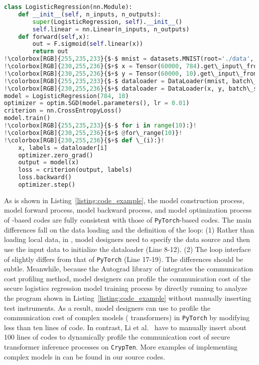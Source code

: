 \begin{lstlisting}[escapechar=!,mathescape,xleftmargin=2em,framexleftmargin=2em, language=python, columns=fullflexible, caption= {An example of modifying a \texttt{PyTorch}-based logistics regression model training codes to be \hawkeye-based. The removed \texttt{PyTorch} codes are highlighted on a red background and labeled with a minus sign at the beginning of the line. The newly added \hawkeye codes are highlighted on a green background and labeled with a plus sign at the beginning of the line.}, label={listing:code_example}]
class LogisticRegression(nn.Module):
    def __init__(self, n_inputs, n_outputs):
        super(LogisticRegression, self).__init__()
        self.linear = nn.Linear(n_inputs, n_outputs)
    def forward(self,x):
        out = F.sigmoid(self.linear(x))
        return out
!\colorbox[RGB]{255,235,233}{$-$ mnist = datasets.MNIST(root='./data', train=True)}!
!\colorbox[RGB]{230,255,236}{$+$ x = Tensor(60000, 784).get\_input\_from(0)}!
!\colorbox[RGB]{230,255,236}{$+$ y = Tensor(60000, 10).get\_input\_from(0)}!
!\colorbox[RGB]{255,235,233}{$-$ dataloader = DataLoader(mnist, batch\_size=128)}!
!\colorbox[RGB]{230,255,236}{$+$ dataloader = DataLoader(x, y, batch\_size = 128)}!
model = LogisticRegression(784, 10)
optimizer = optim.SGD(model.parameters(), lr = 0.01)
criterion = nn.CrossEntropyLoss()
model.train()
!\colorbox[RGB]{255,235,233}{$-$ for i in range(10):}!
!\colorbox[RGB]{230,255,236}{$+$ @for\_range(10)}!
!\colorbox[RGB]{230,255,236}{$+$ def \_(i):}!
    x, labels = dataloader[i]
    optimizer.zero_grad()
    output = model(x)
    loss = criterion(output, labels)
    loss.backward()
    optimizer.step()
\end{lstlisting}


As is shown in Listing~\ref{listing:code_example}, the model construction process, model forward process, model backward process, and model optimization process of \hawkeye-based codes are fully consistent with those of \texttt{PyTorch}-based codes. The main differences fall on the data loading and the definition of the loop: (1) Rather than loading local data, in \hawkeye, model designers need to specify the data source and then use the input data to initialize the dataloader (Line 8-12). (2) The loop interface of \hawkeye slightly differs from that of \texttt{PyTorch} (Line 17-19). The differences should be subtle. Meanwhile, because the Autograd library of \hawkeye integrates the communication cost profiling method, model designers can profile the communication cost of the secure logistics regression model training process by directly running \hawkeye to analyze the program shown in Listing~\ref{listing:code_example} without manually inserting test instruments. As a result, model designers can use \hawkeye to profile the communication cost of complex models ( transformers) in \texttt{PyTorch} by modifying less than ten lines of code. In contrast, Li et al.~\cite{li2023mpcformer} have to manually insert about 100 lines of codes to dynamically profile the communication cost of secure transformer inference processes on \texttt{CrypTen}. More examples of implementing complex models in \hawkeye can be found in our source codes.





